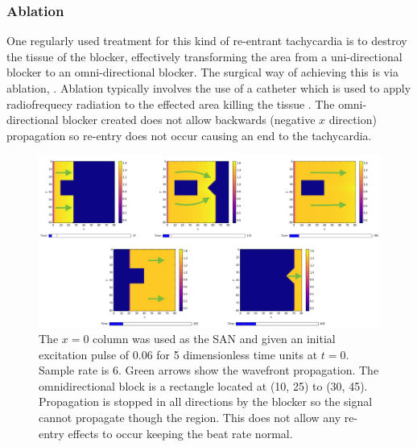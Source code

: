         \subsubsection{Ablation}
        One regularly used treatment for this kind of re-entrant tachycardia is to destroy the tissue of the blocker, effectively transforming the area from a uni-directional blocker to an omni-directional blocker. The surgical way of achieving this is via ablation, \citep{ablation2}. Ablation typically involves the use of a catheter which is used to apply radiofrequecy radiation to the effected area killing the tissue \citep{ablation}. The omni-directional blocker created does not allow backwards (negative $x$ direction) propagation so re-entry does not occur causing an end to the tachycardia.
        \begin{figure}[H]
            \centering
            \includegraphics[width=\textwidth]{images/ablationfull.png}
            \caption{The $x=0$ column was used as the SAN and given an initial excitation pulse of 0.06 for 5 dimensionless time units at $t=0$. Sample rate is 6. Green arrows show the wavefront propagation. The omnidirectional block is a rectangle located at (10, 25) to (30, 45). Propagation is stopped in all directions by the blocker so the signal cannot propagate though the region. This does not allow any re-entry effects to occur keeping the beat rate normal.}
            \label{fig5.3.2a}
        \end{figure}

